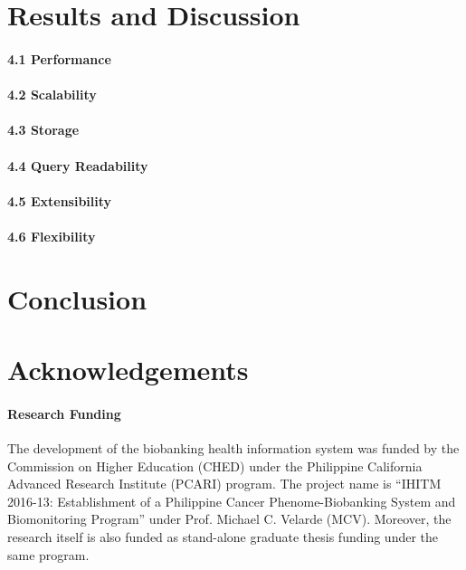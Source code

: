 \documentclass[review]{elsarticle}
\begin{document}
\section{Results and Discussion}

\paragraph{4.1 Performance}

\paragraph{4.2 Scalability}

\paragraph{4.3 Storage}

\paragraph{4.4 Query Readability}

\paragraph{4.5 Extensibility}

\paragraph{4.6 Flexibility}

\section{Conclusion}

\section*{Acknowledgements}

\paragraph{Research Funding} The development of the biobanking health information system was funded by the Commission on Higher Education (CHED) under the Philippine California Advanced Research Institute (PCARI) program. The project name is “IHITM 2016-13: Establishment of a Philippine Cancer Phenome-Biobanking System and Biomonitoring Program” under Prof. Michael C. Velarde (MCV). Moreover, the research itself is also funded as stand-alone graduate thesis funding under the same program. 
\end{document}
